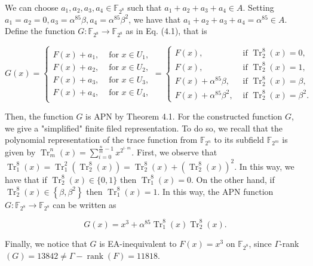 \documentclass[10pt]{article}
\begin{document}
We can choose $a_{1}, a_{2}, a_{3}, a_{4} \in \mathbb{F}_{2^{8}}$ such that $a_{1}+a_{2}+a_{3}+a_{4} \in A$. Setting $a_{1}= a_{2}=0, a_{3}=\alpha^{85} \beta, a_{4}=\alpha^{85} \beta^{2}$, we have that $a_{1}+a_{2}+a_{3}+a_{4}=\alpha^{85} \in A$. Define the function $G: \mathbb{F}_{2^{8}} \rightarrow \mathbb{F}_{2^{8}}$ as in Eq. (4.1), that is

$$
G(x)=\left\{\begin{array}{ll}
F(x)+a_{1}, & \text { for } x \in U_{1}, \\
F(x)+a_{2}, & \text { for } x \in U_{2}, \\
F(x)+a_{3}, & \text { for } x \in U_{3}, \\
F(x)+a_{4}, & \text { for } x \in U_{4},
\end{array}=\left\{\begin{array}{cl}
F(x), & \text { if } \operatorname{Tr}_{2}^{8}(x)=0, \\
F(x), & \text { if } \operatorname{Tr}_{2}^{8}(x)=1, \\
F(x)+\alpha^{85} \beta, & \text { if } \operatorname{Tr}_{2}^{8}(x)=\beta, \\
F(x)+\alpha^{85} \beta^{2}, & \text { if } \operatorname{Tr}_{2}^{8}(x)=\beta^{2} .
\end{array}\right.\right.
$$

Then, the function $G$ is APN by Theorem 4.1. For the constructed function $G$, we give a "simplified" finite filed representation. To do so, we recall that the polynomial representation of the trace function from $\mathbb{F}_{2^{n}}$ to its subfield $\mathbb{F}_{2^{m}}$ is given by $\operatorname{Tr}_{m}^{n}(x)= \sum_{i=0}^{\frac{n}{m}-1} x^{2^{i \cdot m}}$. First, we observe that $\operatorname{Tr}_{1}^{8}(x)=\operatorname{Tr}_{1}^{2}\left(\operatorname{Tr}_{2}^{8}(x)\right)=\operatorname{Tr}_{2}^{8}(x)+\left(\operatorname{Tr}_{2}^{8}(x)\right)^{2}$. In this way, we have that if $\operatorname{Tr}_{2}^{8}(x) \in\{0,1\}$ then $\operatorname{Tr}_{1}^{8}(x)=0$. On the other hand, if $\operatorname{Tr}_{2}^{8}(x) \in\left\{\beta, \beta^{2}\right\}$ then $\operatorname{Tr}_{1}^{8}(x)=1$. In this way, the APN function $G: \mathbb{F}_{2^{8}} \rightarrow \mathbb{F}_{2^{8}}$ can be written as

$$
G(x)=x^{3}+\alpha^{85} \operatorname{Tr}_{1}^{8}(x) \operatorname{Tr}_{2}^{8}(x) .
$$

Finally, we notice that $G$ is EA-inequivalent to $F(x)=x^{3}$ on $\mathbb{F}_{2^{8}}$, since $\Gamma$-rank $(G)= 13842 \neq \Gamma-\operatorname{rank}(F)=11818$.
\end{document}
